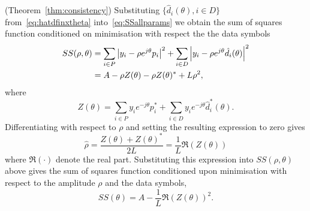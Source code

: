 \documentclass[journal]{IEEEtran}
\begin{document}


\begin{IEEEproof} (Theorem~\ref{thm:consistency})
Substituting $\{ \hat{d}_i(\theta), i \in D \}$ from~\eqref{eq:hatdfinxtheta} into~\eqref{eq:SSallparams} we obtain the sum of squares function conditioned on minimisation with respect the the data symbols
 \begin{align*}
SS(\rho, \theta) &=\sum_{i \in P} {\left|  y_i - \rho e^{j\theta} p_i  \right|}^2 + \sum_{i \in D} {\left|  y_i - \rho e^{j\theta} \hat{d_i}(\theta)  \right|}^2 \\
&= A - \rho Z(\theta) - \rho Z(\theta)^* + L \rho^2,
\end{align*}
where
\[
Z(\theta)  = \sum_{i \in P} y_i e^{-j\theta} p_i^* + \sum_{i \in D} y_i e^{-j\theta} \hat{d}_i^*(\theta).
\]
Differentiating with respect to $\rho$ and setting the resulting expression to zero gives 
\begin{equation}\label{eq:hatrhoZ}
\hat{\rho} = \frac{Z(\theta) + Z(\theta)^*}{2L} = \frac{1}{L}\Re(Z(\theta))
\end{equation}
where $\Re(\cdot)$ denote the real part.  Substituting this expression into $SS(\rho, \theta)$ above gives the sum of squares function conditioned upon minimisation with respect to the amplitude $\rho$ and the data symbols,
\[
SS(\theta) = A - \frac{1}{L}\Re(Z(\theta))^2.
\]


\end{IEEEproof}
\end{document}
